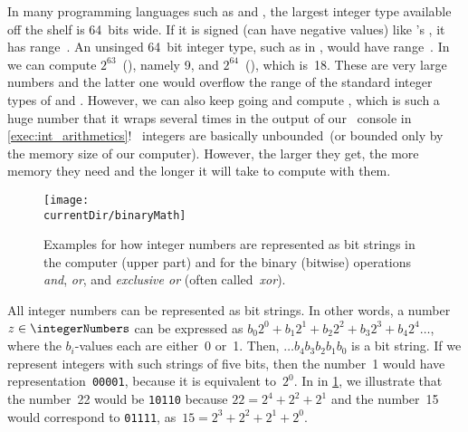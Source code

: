 In many programming languages such as  and , the largest integer type available off the shelf is 64~bits wide.
If it is signed (can have negative values) like 's , it has range~.
An unsinged 64~bit integer type, such as  in , would have range~.
In \python\, we can compute $2^{63}$~(), namely 9, and
$2^{64}$~(), which is~18.
These are very large numbers and the latter one would overflow the range of the standard integer types of  and .
However, we can also keep going and compute , which is such a huge number that it wraps several times in the output of our \python\ console in \cref{exec:int_arithmetics}!
\python\ integers are basically unbounded~(or bounded only by the memory size of our computer).
However, the larger they get, the more memory they need and the longer it will take to compute with them.
\endhsection%
%
%
\label{sec:int:bitstrings}%
%
%
%
\begin{figure}%
\centering%
\texttt{[image: \\currentDir/binaryMath]}%
\caption{Examples for how integer numbers are represented as bit strings in the computer (upper part) and for the binary (bitwise) operations \emph{and}, \emph{or}, and \emph{exclusive or} (often called~\emph{xor}).}%
\label{fig:binaryMath}%
\end{figure}
%

All integer numbers can be represented as bit strings.
In other words, a number $z\in\integerNumbers$ can be expressed as $b_0 2^0 + b_1 2^1 + b_2 2^2 + b_3 2^3 + b_4 2^4\dots$, where the $b_i$-values each are either~0 or~1.
Then, $\dots b_4 b_3 b_2 b_1 b_0$ is a bit string.
If we represent integers with such strings of five bits, then the number~1 would have representation~\texttt{00001}, because it is equivalent to~$2^0$.
In in \cref{fig:binaryMath}, we illustrate that the number~22 would be \texttt{10110} because $22=2^4+2^2+2^1$ and the number~15 would correspond to \texttt{01111}, as~$15=2^3+2^2+2^1+2^0$.

